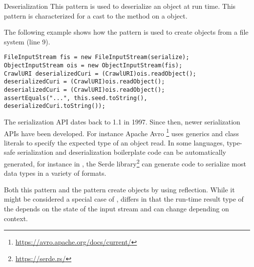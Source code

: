 \begin{pattern}{Deserialization}
This pattern is used to deserialize an object at run time.
This pattern is characterized for a cast to the  method on a  object.

\instances{}
The following example%
\def\urlvar{http://bit.ly/internetarchive_heritrix3_2SF4j7k}
shows how the \thisp{} pattern is used to create objects from a file system (line 9).

\begin{verbatim}
FileInputStream fis = new FileInputStream(serialize);
ObjectInputStream ois = new ObjectInputStream(fis);
CrawlURI deserializedCuri = (CrawlURI)ois.readObject();
deserializedCuri = (CrawlURI)ois.readObject();
deserializedCuri = (CrawlURI)ois.readObject();
assertEquals("...", this.seed.toString(), deserializedCuri.toString());
\end{verbatim}

\discussion{}
  The serialization API dates back to \java{} 1.1 in 1997.
  Since then, newer serialization APIs have been developed.
  For instance Apache Avro%
  \footnote{\url{https://avro.apache.org/docs/current/}}
  uses generics and class literals to specify the expected type of an object
  read. 
  In some languages, type-safe serialization and deserialization 
  boilerplate code can be automatically generated, for instance
  in \rust{}, the Serde library\footnote{\url{https://serde.rs/}}
  can generate code to serialize most data types
  in a variety of formats.

Both this pattern and the  pattern create objects by using reflection.
While it might be considered a special case of , \thisp{} differs
  in that the run-time result type of the  depends on
  the state of the input stream and can change depending on context.
 
\end{pattern}
